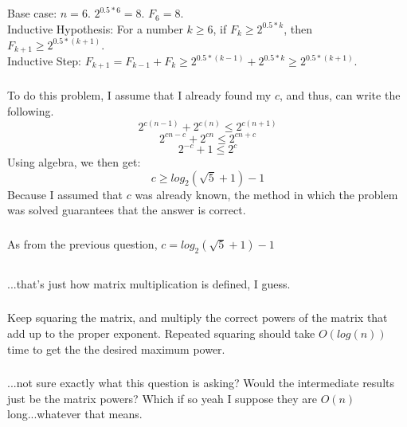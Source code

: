 \documentclass{article}
\begin{document}
\subsection{}
\subsubsection{}
Base case: $n = 6$. $2^{0.5*6} = 8$. $F_6 = 8$.\\
Inductive Hypothesis: For a number $k \geq 6$, if $F_k \geq 2^{0.5*k}$, then $F_{k+1} \geq 2^{0.5*(k + 1)}$.\\
Inductive Step: $F_{k+1} = F_{k-1} + F_k \geq 2^{0.5*(k-1)} + 2^{0.5*k} \geq 2^{0.5*(k+1)}$. 
\subsubsection{}
To do this problem, I assume that I already found my $c$, and thus, can write the following. 
$$2^{c(n-1)}+2^{c(n)} \leq 2^{c(n+1)}$$
$$2^{cn-c}+2^{cn} \leq 2^{cn+c}$$
$$2^{-c}+1 \leq 2^{c}$$
Using algebra, we then get: $$c \geq log_2(\sqrt{5}+1)-1$$
Because I assumed that $c$ was already known, the method in which the problem was solved guarantees that the answer is correct. 
\subsubsection{}As from the previous question, $c = log_2(\sqrt{5}+1)-1$
\subsection{}
\subsubsection{}...that's just how matrix multiplication is defined, I guess.
\subsubsection{}Keep squaring the matrix, and multiply the correct powers of the matrix that add up to the proper exponent. Repeated squaring should take $O(log(n))$ time to get the the desired maximum power.
\subsubsection{}...not sure exactly what this question is asking? Would the intermediate results just be the matrix powers? Which if so yeah I suppose they are $O(n)$ long...whatever that means. 
\end{document}

